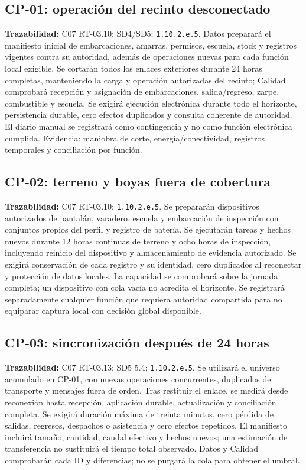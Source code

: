 \subsection{CP-01: operación del recinto desconectado}
\label{caso:cp-01}
\textbf{Trazabilidad:} C07 RT-03.10; SD4/SD5; \texttt{1.10.2.e.5}. Datos preparará el manifiesto inicial de embarcaciones, amarras, permisos, escuela, stock y registros vigentes contra su autoridad, además de operaciones nuevas para cada función local exigible. Se cortarán todos los enlaces exteriores durante 24 horas completas, manteniendo la carga y operación autorizadas del recinto; Calidad comprobará recepción y asignación de embarcaciones, salida/regreso, zarpe, combustible y escuela. Se exigirá ejecución electrónica durante todo el horizonte, persistencia durable, cero efectos duplicados y consulta coherente de autoridad. El diario manual se registrará como contingencia y no como función electrónica cumplida. Evidencia: maniobra de corte, energía/conectividad, registros temporales y conciliación por función.

\subsection{CP-02: terreno y boyas fuera de cobertura}
\label{caso:cp-02}
\textbf{Trazabilidad:} C07 RT-03.10; \texttt{1.10.2.e.5}. Se prepararán dispositivos autorizados de pantalán, varadero, escuela y embarcación de inspección con conjuntos propios del perfil y registro de batería. Se ejecutarán tareas y hechos nuevos durante 12 horas continuas de terreno y ocho horas de inspección, incluyendo reinicio del dispositivo y almacenamiento de evidencia autorizado. Se exigirá conservación de cada registro y su identidad, cero duplicados al reconectar y protección de datos locales. La capacidad se comprobará sobre la jornada completa; un dispositivo con cola vacía no acredita el horizonte. Se registrará separadamente cualquier función que requiera autoridad compartida para no equiparar captura local con decisión global disponible.

\subsection{CP-03: sincronización después de 24 horas}
\label{caso:cp-03}
\textbf{Trazabilidad:} C07 RT-03.13; SD5 5.4; \texttt{1.10.2.e.5}. Se utilizará el universo acumulado en CP-01, con nuevas operaciones concurrentes, duplicados de transporte y mensajes fuera de orden. Tras restituir el enlace, se medirá desde reconexión hasta recepción, aplicación durable, actualización y conciliación completa. Se exigirá duración máxima de treinta minutos, cero pérdida de salidas, regresos, despachos o asistencia y cero efectos repetidos. El manifiesto incluirá tamaño, cantidad, caudal efectivo y hechos nuevos; una estimación de transferencia no sustituirá el tiempo total observado. Datos y Calidad comprobarán cada ID y diferencias; no se purgará la cola para obtener el umbral.

